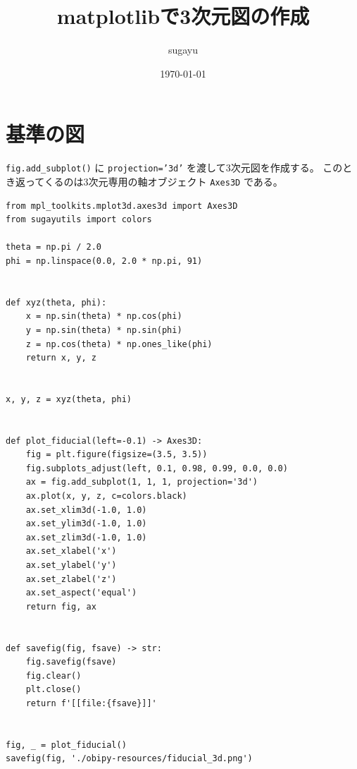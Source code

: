 \documentclass[a4paper, 10pt, notitlepage, twocolumn, uplatex, oneside, dvipdfmx]{jsarticle}
\author{sugayu}
\date{\today}
\title{\textbf{matplotlibで3次元図の作成}}
\begin{document}
\maketitle
\tableofcontents

\section{基準の図}
\label{sec:orgef722fa}
\texttt{fig.add\_subplot()} に \texttt{projection='3d'} を渡して3次元図を作成する。
このとき返ってくるのは3次元専用の軸オブジェクト \texttt{Axes3D} である。

\begin{verbatim}
from mpl_toolkits.mplot3d.axes3d import Axes3D
from sugayutils import colors

theta = np.pi / 2.0
phi = np.linspace(0.0, 2.0 * np.pi, 91)


def xyz(theta, phi):
    x = np.sin(theta) * np.cos(phi)
    y = np.sin(theta) * np.sin(phi)
    z = np.cos(theta) * np.ones_like(phi)
    return x, y, z


x, y, z = xyz(theta, phi)


def plot_fiducial(left=-0.1) -> Axes3D:
    fig = plt.figure(figsize=(3.5, 3.5))
    fig.subplots_adjust(left, 0.1, 0.98, 0.99, 0.0, 0.0)
    ax = fig.add_subplot(1, 1, 1, projection='3d')
    ax.plot(x, y, z, c=colors.black)
    ax.set_xlim3d(-1.0, 1.0)
    ax.set_ylim3d(-1.0, 1.0)
    ax.set_zlim3d(-1.0, 1.0)
    ax.set_xlabel('x')
    ax.set_ylabel('y')
    ax.set_zlabel('z')
    ax.set_aspect('equal')
    return fig, ax


def savefig(fig, fsave) -> str:
    fig.savefig(fsave)
    fig.clear()
    plt.close()
    return f'[[file:{fsave}]]'


fig, _ = plot_fiducial()
savefig(fig, './obipy-resources/fiducial_3d.png')
\end{verbatim}
\end{document}
